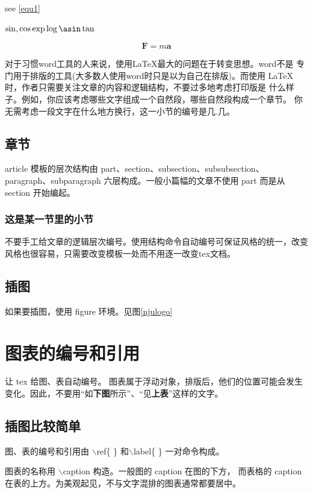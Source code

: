 \documentclass[12pt]{article}
\begin{document}
see \ref{equ1}



$\sin, \cos \exp  \log \asin \tan$

\begin{equation}\label{equ1}
    \mathbf{F}=m \mathbf{a}

\end{equation}


\Huge   \LARGE \Large \large \normalsize \small \scriptsize  \tiny 
对于习惯word工具的人来说，使用\LaTeX 最大的问题在于转变思想。word不是
专门用于排版的工具(大多数人使用word时只是以为自己在排版)。而使用
\LaTeX 时，作者只需要关注文章的内容和逻辑结构，不要过多地考虑打印版是
什么样子。例如，你应该考虑哪些文字组成一个自然段，哪些自然段构成一个章节。
你无需考虑一段文字在什么地方换行，这一小节的编号是几.几。

\subsection{章节}
article 模板的层次结构由 part、section、subsection、subsubsection、
paragraph、subparagraph 六层构成。一般小篇幅的文章不使用 part 而是从
section 开始编起。

\subsubsection{这是某一节里的小节}
不要手工给文章的逻辑层次编号。使用结构命令自动编号可保证风格的统一，改变
风格也很容易，只需要改变模板一处而不用逐一改变tex文档。

\subsection{插图}
如果要插图，使用 figure 环境。见图\ref{njulogo}

\section{图表的编号和引用}
让 tex 给图、表自动编号。 图表属于浮动对象，排版后，他们的位置可能会发生
变化。因此，不要用``如\textbf{下图}所示''、``见\textbf{上表}''这样的文字。
\subsection{插图比较简单}
图、表的编号和引用由 $\backslash$ref\{ \} 和$\backslash$label\{ \}
一对命令构成。

图表的名称用 $\backslash$caption 构造。一般图的 caption 在图的下方，
而表格的 caption 在表的上方。为美观起见，不与文字混排的图表通常都要居中。
\end{document}
